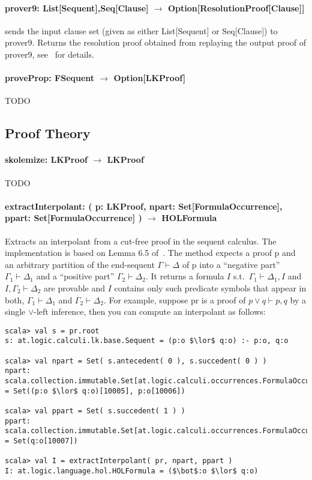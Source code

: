 \documentclass[a4paper, 11pt]{report}
\newcommand{\seq}{\vdash}	%
\begin{document}
\paragraph{\textbf{prover9: List[Sequent],Seq[Clause] $\rightarrow$ Option[ResolutionProof[Clause]]}}
sends the input clause set (given as either List[Sequent] or Seq[Clause]) to prover9. Returns
the resolution proof obtained from replaying the output proof of prover9,
see~\cite{Dunchev12System} for details.

\paragraph{\textbf{proveProp: FSequent $\rightarrow$ Option[LKProof]}}
{\color{red}TODO}

\subsection{Proof Theory}

\paragraph{\textbf{skolemize: LKProof $\rightarrow$ LKProof}}
{\color{red}TODO}

\paragraph{\textbf{extractInterpolant: ( p: LKProof, npart: Set[FormulaOccurrence],
ppart: Set[FormulaOccurrence] ) $\rightarrow$ HOLFormula}}

Extracts an interpolant from a cut-free proof in the sequent calculus. The
implementation is based on Lemma 6.5 of~\cite{Takeuti87Proof}. The method expects
a proof p and an arbitrary partition of the end-sequent $\Gamma \seq \Delta$ of p into a 
``negative part'' $\Gamma_1\seq\Delta_1$ and a ``positive part'' $\Gamma_2 \seq \Delta_2$.
It returns a formula $I$ s.t.\ $\Gamma_1\seq\Delta_1, I$ and $I,\Gamma_2\seq\Delta_2$
are provable and $I$ contains only such predicate symbols that appear in both, $\Gamma_1\seq\Delta_1$
and $\Gamma_2\seq\Delta_2$. For example, suppose pr is a proof of $p \lor q \seq p, q$
by a single $\lor$-left inference, then you can compute an interpolant as follows:
\begin{lstlisting}
scala> val s = pr.root
s: at.logic.calculi.lk.base.Sequent = (p:o $\lor$ q:o) :- p:o, q:o

scala> val npart = Set( s.antecedent( 0 ), s.succedent( 0 ) )
npart: scala.collection.immutable.Set[at.logic.calculi.occurrences.FormulaOccurrence] = Set((p:o $\lor$ q:o)[10005], p:o[10006])

scala> val ppart = Set( s.succedent( 1 ) )
ppart: scala.collection.immutable.Set[at.logic.calculi.occurrences.FormulaOccurrence] = Set(q:o[10007])

scala> val I = extractInterpolant( pr, npart, ppart )
I: at.logic.language.hol.HOLFormula = ($\bot$:o $\lor$ q:o)
\end{lstlisting}
\end{document}

